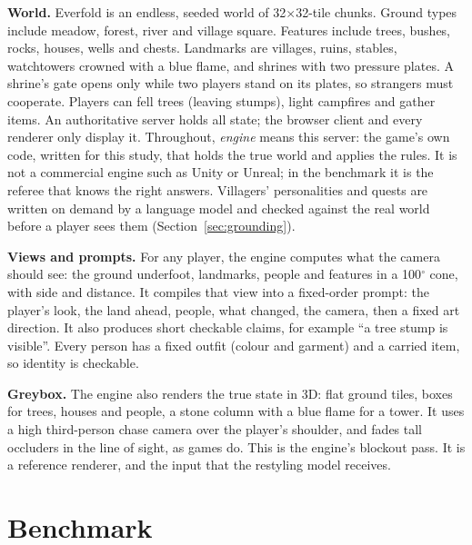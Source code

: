 \documentclass[conference]{IEEEtran}
\begin{document}
\textbf{World.} Everfold is an endless, seeded world of 32$\times$32-tile chunks. Ground types include meadow, forest, river and village square. Features include trees, bushes, rocks, houses, wells and chests. Landmarks are villages, ruins, stables, watchtowers crowned with a blue flame, and shrines with two pressure plates. A shrine's gate opens only while two players stand on its plates, so strangers must cooperate. Players can fell trees (leaving stumps), light campfires and gather items. An authoritative server holds all state; the browser client and every renderer only display it. Throughout, \emph{engine} means this server: the game's own code, written for this study, that holds the true world and applies the rules. It is not a commercial engine such as Unity or Unreal; in the benchmark it is the referee that knows the right answers. Villagers' personalities and quests are written on demand by a language model and checked against the real world before a player sees them (Section~\ref{sec:grounding}).

\textbf{Views and prompts.} For any player, the engine computes what the camera should see: the ground underfoot, landmarks, people and features in a 100$^\circ$ cone, with side and distance. It compiles that view into a fixed-order prompt: the player's look, the land ahead, people, what changed, the camera, then a fixed art direction. It also produces short checkable claims, for example ``a tree stump is visible''. Every person has a fixed outfit (colour and garment) and a carried item, so identity is checkable.

\textbf{Greybox.} The engine also renders the true state in 3D: flat ground tiles, boxes for trees, houses and people, a stone column with a blue flame for a tower. It uses a high third-person chase camera over the player's shoulder, and fades tall occluders in the line of sight, as games do. This is the engine's blockout pass. It is a reference renderer, and the input that the restyling model receives.

\section{Benchmark}
\end{document}
